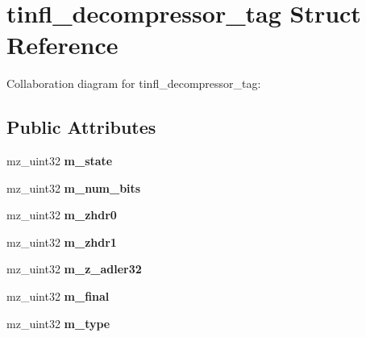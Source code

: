 \hypertarget{structtinfl__decompressor__tag}{}\section{tinfl\+\_\+decompressor\+\_\+tag Struct Reference}
\label{structtinfl__decompressor__tag}


Collaboration diagram for tinfl\+\_\+decompressor\+\_\+tag\+:
\subsection*{Public Attributes}
\begin{DoxyCompactItemize}
\item 
\mbox{\label{structtinfl__decompressor__tag_a92296a332b76f047a4cd7ad8437c4735}} 
mz\+\_\+uint32 {\bfseries m\+\_\+state}
\item 
\mbox{\label{structtinfl__decompressor__tag_aa27988907a00d70bbeb36f4c4c09a2cf}} 
mz\+\_\+uint32 {\bfseries m\+\_\+num\+\_\+bits}
\item 
\mbox{\label{structtinfl__decompressor__tag_a3f27466b6f5ec49b73db82fde43118c3}} 
mz\+\_\+uint32 {\bfseries m\+\_\+zhdr0}
\item 
\mbox{\label{structtinfl__decompressor__tag_aa20c2fae45d99a1ae97fb7d58fefcd48}} 
mz\+\_\+uint32 {\bfseries m\+\_\+zhdr1}
\item 
\mbox{\label{structtinfl__decompressor__tag_aab03536da4b49c3125b11f8c7e999895}} 
mz\+\_\+uint32 {\bfseries m\+\_\+z\+\_\+adler32}
\item 
\mbox{\label{structtinfl__decompressor__tag_a39ed69be124315c9b42358d27b285987}} 
mz\+\_\+uint32 {\bfseries m\+\_\+final}
\item 
\mbox{\label{structtinfl__decompressor__tag_a25a2446091964983dc8a4b01064a287c}} 
mz\+\_\+uint32 {\bfseries m\+\_\+type}
\item 
\mbox{\label{structtinfl__decompressor__tag_a80c6f22b32fb288a5d376f6f93b2d63d}} 

\end{DoxyCompactItemize}

